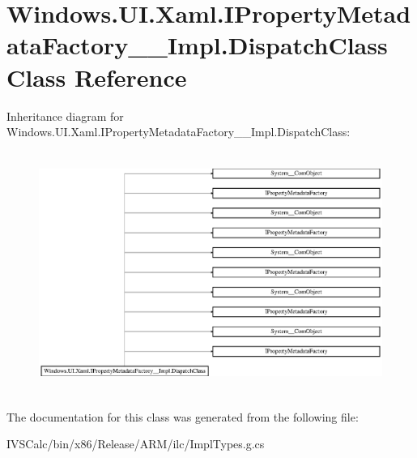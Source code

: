 \hypertarget{class_windows_1_1_u_i_1_1_xaml_1_1_i_property_metadata_factory_____impl_1_1_dispatch_class}{}\section{Windows.\+U\+I.\+Xaml.\+I\+Property\+Metadata\+Factory\+\_\+\+\_\+\+Impl.\+Dispatch\+Class Class Reference}
\label{class_windows_1_1_u_i_1_1_xaml_1_1_i_property_metadata_factory_____impl_1_1_dispatch_class}
Inheritance diagram for Windows.\+U\+I.\+Xaml.\+I\+Property\+Metadata\+Factory\+\_\+\+\_\+\+Impl.\+Dispatch\+Class\+:\begin{figure}[H]
\begin{center}
\leavevmode
\includegraphics[height=7.917737cm]{class_windows_1_1_u_i_1_1_xaml_1_1_i_property_metadata_factory_____impl_1_1_dispatch_class}
\end{center}
\end{figure}


The documentation for this class was generated from the following file\+:\begin{DoxyCompactItemize}
\item 
I\+V\+S\+Calc/bin/x86/\+Release/\+A\+R\+M/ilc/Impl\+Types.\+g.\+cs\end{DoxyCompactItemize}

